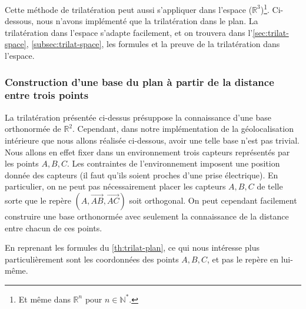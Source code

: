 \documentclass[french, a4paper, 12pt, parskip]{scrartcl}
\begin{document}
Cette méthode de trilatération peut aussi s'appliquer dans l'espace
($\mathbb{R}^3$)\footnote{Et même dans $\mathbb{R}^n$ pour
$n\in\mathbb{N}^*$.}. Ci-dessous, nous n'avons implémenté que la trilatération
dans le plan. La trilatération dans l'espace s'adapte facilement, et on
trouvera dans l'\autoref{sec:trilat-space}, \autoref{subsec:trilat-space}, les
formules et la preuve de la trilatération dans l'espace.

\subsubsection{Construction d'une base du plan à partir de la distance entre trois points}

La trilatération présentée ci-dessus présuppose la connaissance d'une base
orthonormée de $\mathbb{R}^2$. Cependant, dans notre implémentation de la
géolocalisation intérieure que nous allons réalisée ci-dessous, avoir une telle
base n'est pas trivial. Nous allons en effet fixer dans un environnement trois
capteurs représentés par les points $A, B, C$. Les contraintes de
l'environnement imposent une position donnée des capteurs (il faut qu'ils
soient proches d'une prise électrique). En particulier, on ne peut pas
nécessairement placer les capteurs $A, B, C$ de telle sorte que le repère
$\left(A, \overrightarrow{AB}, \overrightarrow{AC}\right)$ soit orthogonal. On
peut cependant facilement construire une base orthonormée avec seulement la
connaissance de la distance entre chacun de ces points.

En reprenant les formules du \autoref{th:trilat-plan}, ce qui nous intéresse
plus particulièrement sont les coordonnées des points $A, B, C$, et pas le
repère en lui-même.
\end{document}

